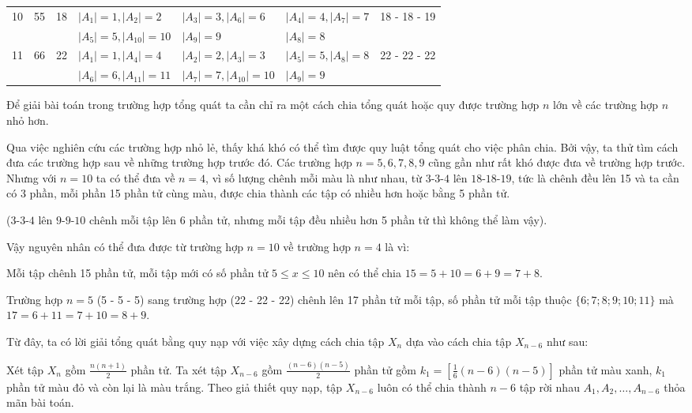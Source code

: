 \begin{bt}
{\begin{center}
\begin{tabular}{|p{2em}|m{2em}|m{2em}|m{3cm}|m{3cm}|m{3cm}|m{2.2cm}|}
				\hline 
				\multirow{2}{2em}{10} & \multirow{2}{2em}{55} & \multirow{2}{2em}{18} & $|A_1|=1, |A_2|=2$ & $|A_3|=3, |A_6|=6$ & $|A_4|=4,|A_7|=7$ & \multirow{2}{2cm}{18 - 18 - 19} \\ 
				&  &  & $|A_5|=5, |A_{10}|=10$ & $|A_9|=9$ & $|A_8|=8$ & \\
				\hline 
				\multirow{2}{2em}{11} & \multirow{2}{2em}{66} & \multirow{2}{2em}{22} & $|A_1|=1, |A_4|=4$ & $|A_2|=2, |A_3|=3$ & $|A_5|=5, |A_8|=8$ & \multirow{2}{2cm}{22 - 22 - 22} \\ 
				&  &  & $|A_{6}|=6,|A_{11}|=11$ & $|A_7|=7, |A_{10}|={10}$ & $|A_9|=9$ & \\
				\hline 
			\end{tabular} 
		\end{center}
		Để giải bài toán trong trường hợp tổng quát ta cần chỉ ra một cách chia tổng quát hoặc quy được trường hợp $n$ lớn về các trường hợp $n$ nhỏ hơn.
		
		Qua việc nghiên cứu các trường hợp nhỏ lẻ, thấy khá khó có thể tìm được quy luật tổng quát cho việc phân chia. Bởi vậy, ta thử tìm cách đưa các trường hợp sau về những trường hợp trước đó. Các trường hợp $n=5,6,7,8,9$ cũng gần như rất khó được đưa về trường hợp trước. Nhưng với $n=10$ ta có thể đưa về $n=4$, vì số lượng chênh mỗi màu là như nhau, từ $3 \text{-} 3 \text{-} 4$ lên $18 \text{-} 18 \text{-} 19$, tức là chênh đều lên 15 và ta cần có 3 phần, mỗi phần 15 phần tử cùng màu, được chia thành các tập có nhiều hơn hoặc bằng 5 phần tử.
		
		($3 \text{-} 3 \text{-} 4$ lên $9 \text{-} 9 \text{-} 10$ chênh mỗi tập lên 6 phần tử, nhưng mỗi tập đều nhiều hơn 5 phần tử thì không thể làm vậy).
		
		Vậy nguyên nhân có thể đưa được từ trường hợp $n=10$ về trường hợp $n=4$ là vì:
		
		Mỗi tập chênh 15 phần tử, mỗi tập mới có số phần tử $5\leq x\leq 10$ nên có thể chia $15 = 5+10=6+9=7+8$.
		
		Trường hợp $n=5$ (5 - 5 - 5) sang trường hợp (22 - 22 - 22) chênh lên 17 phần tử mỗi tập, số phần tử mỗi tập thuộc $\{6;7;8;9;10;11\}$ mà $17=6+11=7+10=8+9$.
		
		Từ đây, ta có lời giải tổng quát bằng quy nạp với việc xây dựng cách chia tập $X_n$ dựa vào cách chia tập $X_{n-6}$ như sau:
		
		Xét tập $X_n$ gồm $\frac{n(n+1)}{2}$ phần tử. Ta xét tập $X_{n-6}$ gồm $\frac{(n-6)(n-5)}{2}$ phần tử gồm $k_1=\left[\frac{1}{6}(n-6)(n-5)\right]$ phần tử màu xanh, $k_1$ phần tử màu đỏ và còn lại là màu trắng. Theo giả thiết quy nạp, tập $X_{n-6}$ luôn có thể chia thành $n-6$ tập rời nhau $A_1,A_2,\hdots, A_{n-6}$ thỏa mãn bài toán.
		
}
\end{bt}

